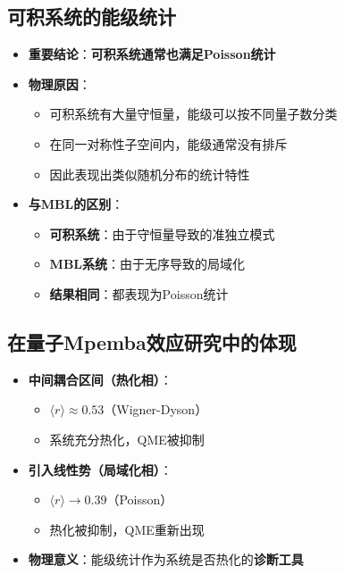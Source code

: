 \documentclass[11pt,a4paper]{article}
\begin{document}
\subsection{可积系统的能级统计}
\begin{itemize}
    \item \textbf{重要结论}：\textbf{可积系统通常也满足Poisson统计}
    \item \textbf{物理原因}：
    \begin{itemize}
        \item 可积系统有大量守恒量，能级可以按不同量子数分类
        \item 在同一对称性子空间内，能级通常没有排斥
        \item 因此表现出类似随机分布的统计特性
    \end{itemize}
    \item \textbf{与MBL的区别}：
    \begin{itemize}
        \item \textbf{可积系统}：由于守恒量导致的准独立模式
        \item \textbf{MBL系统}：由于无序导致的局域化
        \item \textbf{结果相同}：都表现为Poisson统计
    \end{itemize}
\end{itemize}

\subsection{在量子Mpemba效应研究中的体现}
\begin{itemize}
    \item \textbf{中间耦合区间（热化相）}：
    \begin{itemize}
        \item $\langle r \rangle \approx 0.53$（Wigner-Dyson）
        \item 系统充分热化，QME被抑制
    \end{itemize}
    
    \item \textbf{引入线性势（局域化相）}：
    \begin{itemize}
        \item $\langle r \rangle \rightarrow 0.39$（Poisson）
        \item 热化被抑制，QME重新出现
    \end{itemize}
    
    \item \textbf{物理意义}：能级统计作为系统是否热化的\textbf{诊断工具}
\end{itemize}
\end{document}
